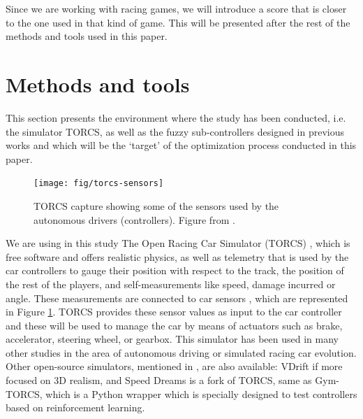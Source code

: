 \documentclass[10pt,journal,compsoc]{IEEEtran}
\begin{document}
Since we are working with racing games, we will introduce a score that
is closer to the one used in that kind of game. This will be
presented after the rest of the methods and tools used in this paper. 



\section{Methods and tools}
\label{sec:methods}

This section presents the environment where the study has been conducted, i.e. the simulator TORCS, as well as the fuzzy sub-controllers designed in previous works and which will be the `target' of the optimization process conducted in this paper. 

%


\begin{figure}[!ht] 
	\begin{center}
		\texttt{[image: fig/torcs-sensors]}
		\caption {TORCS capture showing some of the sensors
                used by the autonomous drivers (controllers). Figure from \cite{DBLP:conf/cig/SalemMG19}.}
		\label{fig:torcs-sensors}
	\end{center}
\end{figure}


We are using in this study The Open Racing Car Simulator (TORCS) \cite{torcs4}, which is free software and offers realistic physics, as well as telemetry that is used by the car controllers to gauge their position with respect to the track, the position of the rest of the players, and self-measurements like speed, damage incurred or angle. These measurements are connected to car sensors \cite{torcs5}, which are represented in Figure \ref{fig:torcs-sensors}. TORCS provides these sensor values as input to the car controller and these will be
used to manage the car by means of actuators such as brake, accelerator, steering wheel, or gearbox. 
This simulator has been used in many other studies in the area of autonomous driving or simulated racing car evolution.
Other open-source simulators, mentioned in \cite{Loiacono:2012:LEA:2212908.2212953}, are also available: VDrift
if more focused on 3D realism, and Speed Dreams is  a fork of
TORCS, same as Gym-TORCS, which is a Python wrapper which is specially designed to test controllers based on reinforcement learning.
\end{document}
